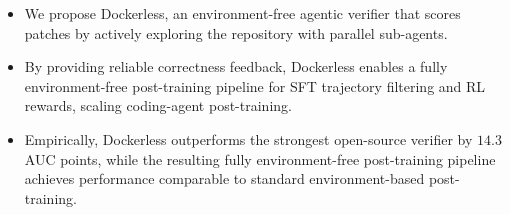 \documentclass[]{arxiv_template}
\newcommand{\approach}{Dockerless\xspace}
\newcommand{\zeng}[1]{\textcolor[rgb]{1,0.66,0}{\textbf{[Zeng: #1]}}}
\newcommand{\gu}[1]{\textcolor[rgb]{0,0.66,1}{\textbf{[Gu: #1]}}}
\newcommand{\shi}[1]{\textcolor[rgb]{0,0.55,0.25}{\textbf{[Shi: #1]}}}
\begin{document}
\begin{itemize}
  \item We propose \approach, an environment-free agentic verifier that scores patches by actively exploring the repository with parallel sub-agents.
  \item By providing reliable correctness feedback, \approach enables a fully environment-free post-training pipeline for SFT trajectory filtering and RL rewards, scaling coding-agent post-training.
  \item Empirically, \approach outperforms the strongest open-source verifier by $14.3$ AUC points, while the resulting fully environment-free post-training pipeline achieves performance comparable to standard environment-based post-training.
\end{itemize}
\end{document}
